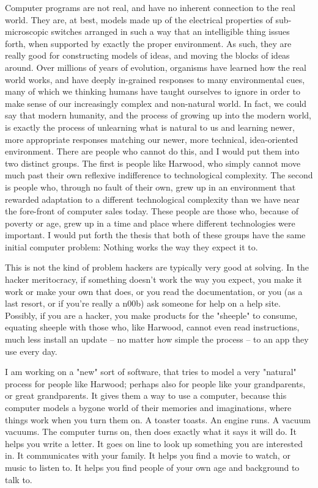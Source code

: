         Computer programs are not real, and have no inherent connection to the real world. They are, at best, models made up of the electrical properties of sub-microscopic switches arranged in such a way that an intelligible thing issues forth, when supported by exactly the proper environment. As such, they are really good for constructing models of ideas, and moving the blocks of ideas around. Over millions of years of evolution, organisms have learned how the real world works, and have deeply in-grained responses to many environmental cues, many of which we thinking humans have taught ourselves to ignore in order to make sense of our increasingly complex and non-natural world. In fact, we could say that modern humanity, and the process of growing up into the modern world, is exactly the process of unlearning what is natural to us and learning newer, more appropriate responses matching our newer, more technical, idea-oriented environment. There are people who cannot do this, and I would put them into two distinct groups. The first is people like Harwood, who simply cannot move much past their own reflexive indifference to technological complexity. The second is people who, through no fault of their own, grew up in an environment that rewarded adaptation to a different technological complexity than we have near the fore-front of computer sales today. These people are those who, because of poverty or age, grew up in a time and place where different technologies were important. I would put forth the thesis that both of these groups have the same initial computer problem: Nothing works the way they expect it to.
        
        This is not the kind of problem hackers are typically very good at solving. In the hacker meritocracy, if something doesn't work the way you expect, you make it work or make your own that does, or you read the documentation, or you (as a last resort, or if you're really a n00b) ask someone for help on a help site. Possibly, if you are a hacker, you make products for the "sheeple" to consume, equating sheeple with those who, like Harwood, cannot even read instructions, much less install an update -- no matter how simple the process -- to an app they use every day.
        
        I am working on a "new" sort of software, that tries to model a very "natural" process for people like Harwood; perhaps also for people like your grandparents, or great grandparents. It gives them a way to use a computer, because this computer models a bygone world of their memories and imaginations, where things work when you turn them on. A toaster toasts. An engine runs. A vacuum vacuums. The computer turns on, then does exactly what it says it will do. It helps you write a letter. It goes on line to look up something you are interested in. It communicates with your family. It helps you find a movie to watch, or music to listen to. It helps you find people of your own age and background to talk to.
        
